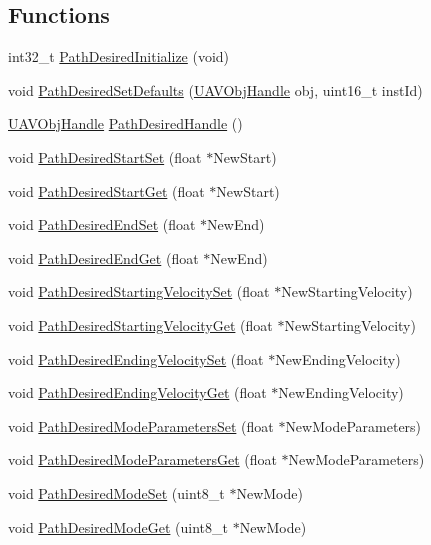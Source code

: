\subsection*{\-Functions}
\begin{DoxyCompactItemize}
\item 
int32\-\_\-t \hyperlink{group___path_desired_ga66098fbf154880a0cd9e1420313a3a18}{\-Path\-Desired\-Initialize} (void)
\item 
void \hyperlink{group___path_desired_gac0788b961d023f0b4b44793f300e1093}{\-Path\-Desired\-Set\-Defaults} (\hyperlink{targets_2_u_a_v_objects_2inc_2uavobjectmanager_8h_a279053e22be53ce9f895043aaeb91e3b}{\-U\-A\-V\-Obj\-Handle} obj, uint16\-\_\-t inst\-Id)
\item 
\hyperlink{targets_2_u_a_v_objects_2inc_2uavobjectmanager_8h_a279053e22be53ce9f895043aaeb91e3b}{\-U\-A\-V\-Obj\-Handle} \hyperlink{group___path_desired_gac540d039d72f38ae8c13d15787273f2a}{\-Path\-Desired\-Handle} ()
\item 
void \hyperlink{group___path_desired_ga55f5e622e292127c5daefcaf7b5e206b}{\-Path\-Desired\-Start\-Set} (float $\ast$\-New\-Start)
\item 
void \hyperlink{group___path_desired_gab5068fd348621285d1a6c480046d0593}{\-Path\-Desired\-Start\-Get} (float $\ast$\-New\-Start)
\item 
void \hyperlink{group___path_desired_gaec0faa804ba6c8e6b6a32aea857ccf44}{\-Path\-Desired\-End\-Set} (float $\ast$\-New\-End)
\item 
void \hyperlink{group___path_desired_gae9fa2b498588cd86a54ab15fc10557ea}{\-Path\-Desired\-End\-Get} (float $\ast$\-New\-End)
\item 
void \hyperlink{group___path_desired_ga5de683f4571830648b5c02a64e68a417}{\-Path\-Desired\-Starting\-Velocity\-Set} (float $\ast$\-New\-Starting\-Velocity)
\item 
void \hyperlink{group___path_desired_ga63d56c96ea3d97372a0b591688e1f460}{\-Path\-Desired\-Starting\-Velocity\-Get} (float $\ast$\-New\-Starting\-Velocity)
\item 
void \hyperlink{group___path_desired_ga0da2064f57612cd92b9caf41c24f5844}{\-Path\-Desired\-Ending\-Velocity\-Set} (float $\ast$\-New\-Ending\-Velocity)
\item 
void \hyperlink{group___path_desired_ga9f4256aa276b9a6faee700cd4760d031}{\-Path\-Desired\-Ending\-Velocity\-Get} (float $\ast$\-New\-Ending\-Velocity)
\item 
void \hyperlink{group___path_desired_ga600ee9c6ededc859b50f53a6210a115f}{\-Path\-Desired\-Mode\-Parameters\-Set} (float $\ast$\-New\-Mode\-Parameters)
\item 
void \hyperlink{group___path_desired_ga810f474447d8ba852e2d1069b8969d97}{\-Path\-Desired\-Mode\-Parameters\-Get} (float $\ast$\-New\-Mode\-Parameters)
\item 
void \hyperlink{group___path_desired_ga216e6d9044197f477626edd13d9189fd}{\-Path\-Desired\-Mode\-Set} (uint8\-\_\-t $\ast$\-New\-Mode)
\item 
void \hyperlink{group___path_desired_ga8a8fd86b9aeaf27414ff82c8af197b87}{\-Path\-Desired\-Mode\-Get} (uint8\-\_\-t $\ast$\-New\-Mode)
\end{DoxyCompactItemize}



